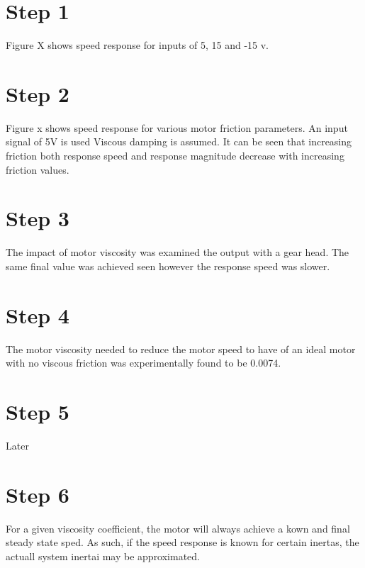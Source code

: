 \documentclass{report}
\begin{document}
\section{Step 1}

Figure X
shows speed response for inputs of 5, 15 and -15 v.


\section{Step 2}

Figure x shows speed response for various motor friction parameters.
An input signal of 5V is used Viscous damping is assumed.
It can be seen that increasing friction both response speed and response magnitude decrease with increasing friction values.


\section{Step 3}

The impact of motor viscosity was examined the output with a gear head.
The same final value was achieved seen however the response speed was slower.


\section{Step 4}

The motor viscosity needed to reduce the motor speed to have of an ideal motor with no viscous friction
was experimentally found to be 0.0074.


\section{Step 5}

Later

\section{Step 6}

For a given viscosity coefficient, the motor will always achieve a kown and final steady state sped.
As such, if the speed response is known for certain inertas, the actuall system inertai may be approximated.
\end{document}

